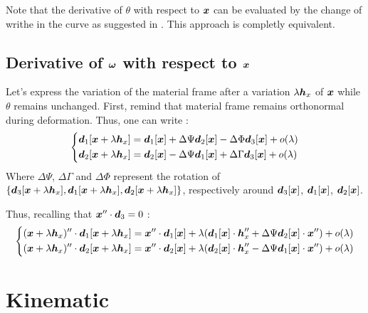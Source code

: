Note that the derivative of $\theta$ with respect to $\boldsymbol{x}$ can be evaluated by the change of writhe in the curve as suggested in \cite{deVries2005}. This approach is completly equivalent.

\subsection{Derivative of $\boldsymbol{\omega}$ with respect to $\boldsymbol{x}$}

Let’s express the variation of the material frame after a variation $\lambda \boldsymbol{h}_x$ of $\boldsymbol{x}$ while $\theta$ remains unchanged. First, remind that material frame remains orthonormal during deformation. Thus, one can write :
\begin{equation}
	\left\{
		\begin{aligned}
			&\boldsymbol{d}_1[\boldsymbol{x}+\lambda \boldsymbol{h}_x] = \boldsymbol{d}_1[\boldsymbol{x}] + \Delta \Psi \boldsymbol{d}_2[\boldsymbol{x}] - \Delta \Phi \boldsymbol{d}_3[\boldsymbol{x}] + o(\lambda)\\
			&\boldsymbol{d}_2[\boldsymbol{x}+\lambda \boldsymbol{h}_x] = \boldsymbol{d}_2[\boldsymbol{x}] - \Delta \Psi \boldsymbol{d}_1[\boldsymbol{x}] + \Delta\Gamma \boldsymbol{d}_3[\boldsymbol{x}] + o(\lambda)
		\end{aligned}
	\right.
\end{equation}
Where $\Delta\Psi$, $\Delta\Gamma$ and $\Delta\Phi$ represent the rotation of $\{\boldsymbol{d}_3[\boldsymbol{x}+\lambda \boldsymbol{h}_x],\boldsymbol{d}_1[\boldsymbol{x}+\lambda \boldsymbol{h}_x],\boldsymbol{d}_2[\boldsymbol{x}+\lambda \boldsymbol{h}_x]\}$, respectively around $\boldsymbol{d}_3[\boldsymbol{x}]$, $\boldsymbol{d}_1[\boldsymbol{x}]$, $\boldsymbol{d}_2[\boldsymbol{x}]$.

Thus, recalling that $\boldsymbol{x}''\cdot\boldsymbol{d}_3 = 0$ :
\begin{equation}
	\left\{
		\begin{aligned}
			(\boldsymbol{x}+\lambda \boldsymbol{h}_x)'' \cdot \boldsymbol{d}_1[\boldsymbol{x}+\lambda \boldsymbol{h}_x] = 
			\boldsymbol{x}''\cdot\boldsymbol{d}_1[\boldsymbol{x}] + \lambda(\boldsymbol{d}_1[\boldsymbol{x}]\cdot\boldsymbol{h}''_x + \Delta\Psi \boldsymbol{d}_2[\boldsymbol{x}]\cdot\boldsymbol{x}'') + o(\lambda) \\
			(\boldsymbol{x}+\lambda \boldsymbol{h}_x)'' \cdot \boldsymbol{d}_2[\boldsymbol{x}+\lambda \boldsymbol{h}_x] =
			\boldsymbol{x}''\cdot\boldsymbol{d}_2[\boldsymbol{x}] + \lambda(\boldsymbol{d}_2[\boldsymbol{x}]\cdot\boldsymbol{h}''_x - \Delta\Psi \boldsymbol{d}_1[\boldsymbol{x}]\cdot\boldsymbol{x}'') + o(\lambda)
		\end{aligned}
		\right.
\end{equation}


\section{Kinematic}

